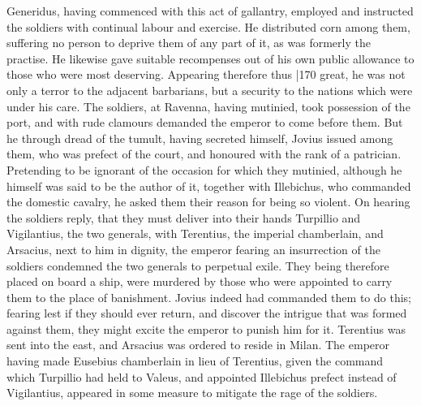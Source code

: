Generidus, having commenced with this act of gallantry, employed and instructed the soldiers with continual labour and exercise. He distributed corn among them, suffering no person to deprive them of any part of it, as was formerly the practise. He likewise gave suitable recompenses out of his own public allowance to those who were most deserving. Appearing therefore thus
|170 great, he was not only a terror to the adjacent barbarians, but a security to the nations which were under his care. The soldiers, at Ravenna, having mutinied, took possession of the port, and with rude clamours demanded the emperor to come before them. But he through dread of the tumult, having secreted himself, Jovius issued among them, who was prefect of the court, and honoured with the rank of a patrician. Pretending to be ignorant of the occasion for which they mutinied, although he himself was said to be the author of it, together with Illebichus, who commanded the domestic cavalry, he asked them their reason for being so violent. On hearing the soldiers reply, that they must deliver into their hands Turpillio and Vigilantius, the two generals, with Terentius, the imperial chamberlain, and Arsacius, next to him in dignity, the emperor fearing an insurrection of the soldiers condemned the two generals to perpetual exile. They being therefore placed on board a ship, were murdered by those who were appointed to carry them to the place of banishment. Jovius indeed had commanded them to do this; fearing lest if they should ever return, and discover the intrigue that was formed against them, they might excite the emperor to punish him for it. Terentius was sent into the east, and Arsacius was ordered to reside in Milan. The emperor having made Eusebius chamberlain in lieu of Terentius, given the command which Turpillio had held to Valeus, and appointed Illebichus prefect instead of Vigilantius, appeared in some measure to mitigate the rage of the soldiers.

